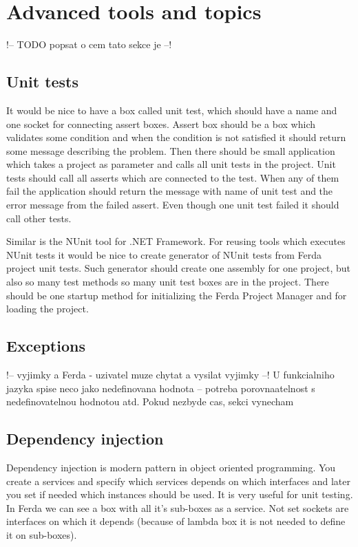 \documentclass[a4paper,12pt]{book}
\begin{document}
\section{Advanced tools and topics}
!-- TODO popsat o cem tato sekce je --!

\subsection{Unit tests}
It would be nice to have a box called unit test, which should have a name and one socket for connecting assert boxes. Assert box should be a box which validates some condition and when the condition is not satisfied it should return some message describing the problem. Then there should be small application which takes a project as parameter and calls all unit tests in the project. Unit tests should call all asserts which are connected to the test. When any of them fail the application should return the message with name of unit test and the error message from the failed assert. Even though one unit test failed it should call other tests.

Similar is the NUnit tool for .NET Framework. For reusing tools which executes NUnit tests it would be nice to create generator of NUnit tests from Ferda project unit tests. Such generator should create one assembly for one project, but also so many test methods so many unit test boxes are in the project. There should be one startup method for initializing the Ferda Project Manager and for loading the project. 

\subsection{Exceptions}
!-- vyjimky a Ferda - uzivatel muze chytat a vysilat vyjimky --! U funkcialniho jazyka spise neco jako nedefinovana hodnota -- potreba porovnaatelnost s nedefinovatelnou hodnotou atd. Pokud nezbyde cas, sekci vynecham

\subsection{Dependency injection}
Dependency injection is modern pattern in object oriented programming. You create a services and specify which services depends on which interfaces and later you set if needed which instances should be used. It is very useful for unit testing. In Ferda we can see a box with all it's sub-boxes as a service. Not set sockets are interfaces on which it depends (because of lambda box it is not needed to define it on sub-boxes).
\end{document}
